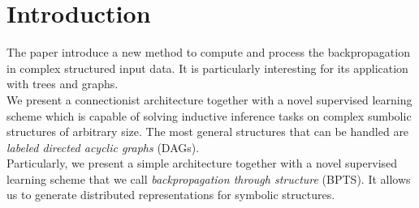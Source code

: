 \section{Introduction}

The paper introduce a new method to compute and process the backpropagation in
complex structured input data. It is particularly interesting for its
application with trees and graphs.\\
We present a connectionist architecture together with a novel supervised
learning scheme which is capable of solving inductive inference tasks on complex
sumbolic structures of arbitrary size. The most general structures that can be
handled are \textit{labeled directed acyclic graphs} (DAGs).\\
Particularly, we present a simple architecture together with a novel supervised
learning scheme that we call \textit{backpropagation through structure} (BPTS).
It allows us to generate distributed representations for symbolic structures.
